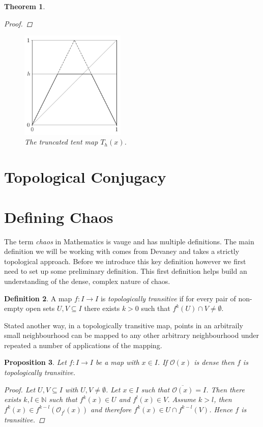 \documentclass[11pt,a4paper,oneside]{memoir}
\theoremstyle{plain}
\newtheorem{thm}{Theorem}[chapter]
\newtheorem{prop}[thm]{Proposition}
\theoremstyle{definition}
\newtheorem{defn}[thm]{Definition}
\begin{document}
\begin{thm}
\begin{proof}
    \end{proof}

    \begin{figure}[h]
        \centering
        \includegraphics[width=5cm]{truncated_tent}
        \caption{The truncated tent map $T_h(x)$.}
        \label{fig:truncated_tent}
    \end{figure}
\end{thm}

\section{Topological Conjugacy}


\section{Defining Chaos}
The term \emph{chaos} in Mathematics is vauge and has multiple definitions. The main definition we will be working with comes from Devaney \cite{devaney} and takes a strictly topological approach. Before we introduce this key definition however we first need to set up some preliminary definition. This first definition helps build an understanding of the dense, complex nature of chaos.
\begin{defn}
    A map $f: I \to I$ is \emph{topologically transitive} if for every pair of non-empty open sets $U, V \subseteq I$ there exists $k > 0$ such that $f^k(U) \cap V \neq \emptyset$.
\end{defn}
Stated another way, in a topologically transitive map, points in an arbitraily small neighbourhood can be mapped to any other arbitrary neighbourhood under repeated a number of applications of the mapping.

\begin{prop} \label{prop:dense-transitive}
    Let $f: I \to I$ be a map with $x \in I$. If $\mathcal{O}(x)$ is dense then $f$ is topologically transitive.
    \begin{proof}
        Let $U, V \subseteq I$ with $U, V \neq \emptyset$. Let $x \in I$ such that $\overline{\mathcal{O}(x)} = I$. Then there exists $k, l \in \mathbb{N}$ such that $f^k(x) \in U$ and $f^l(x) \in V$. Assume $k > l$, then $f^k(x) \in f^{k - l}\left( \mathcal{O}_{f^l}(x) \right)$ and therefore $f^k(x) \in U \cap f^{k-l}(V)$. Hence $f$ is transitive.
    \end{proof}
\end{prop}
\end{document}
